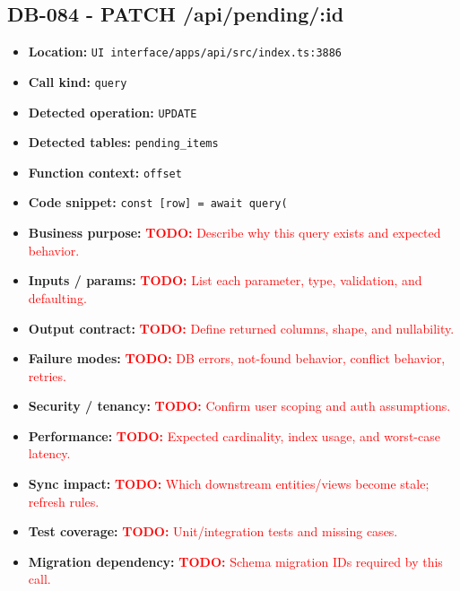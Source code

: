 \documentclass[11pt]{article}
\newcommand{\todoitem}[1]{\textcolor{red}{\textbf{TODO:} #1}}
\begin{document}
\subsection{DB-084 - PATCH /api/pending/:id}
\begin{itemize}[leftmargin=1.5em]
\item \textbf{Location:} \texttt{UI interface/apps/api/src/index.ts:3886}
\item \textbf{Call kind:} \texttt{query}
\item \textbf{Detected operation:} \texttt{UPDATE}
\item \textbf{Detected tables:} \texttt{pending\_items}
\item \textbf{Function context:} \texttt{offset}
\item \textbf{Code snippet:} \texttt{const [row] = await query(}
\item \textbf{Business purpose:} \todoitem{Describe why this query exists and expected behavior.}
\item \textbf{Inputs / params:} \todoitem{List each parameter, type, validation, and defaulting.}
\item \textbf{Output contract:} \todoitem{Define returned columns, shape, and nullability.}
\item \textbf{Failure modes:} \todoitem{DB errors, not-found behavior, conflict behavior, retries.}
\item \textbf{Security / tenancy:} \todoitem{Confirm user scoping and auth assumptions.}
\item \textbf{Performance:} \todoitem{Expected cardinality, index usage, and worst-case latency.}
\item \textbf{Sync impact:} \todoitem{Which downstream entities/views become stale; refresh rules.}
\item \textbf{Test coverage:} \todoitem{Unit/integration tests and missing cases.}
\item \textbf{Migration dependency:} \todoitem{Schema migration IDs required by this call.}
\end{itemize}
\end{document}
